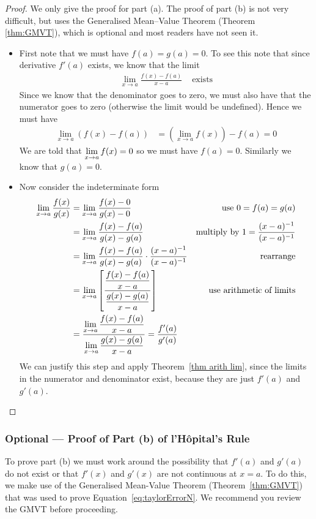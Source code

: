 \begin{proof}
We only give the proof for part (a). The proof of part (b) is not very difficult,
but uses the Generalised Mean--Value Theorem (Theorem \ref{thm:GMVT}), which is
optional and most readers have not seen it.

\begin{itemize}
 \item First note that we must have $f(a)=g(a)=0$. To see this note that since derivative
$f'(a)$ exists, we know that the limit
\begin{align*}
 \lim_{x\to a} \frac{f(x)-f(a)}{x-a} & \text{ exists}
\end{align*}
Since we know that the denominator goes to zero, we must also have that the numerator
goes to zero (otherwise the limit would be undefined). Hence we must have
\begin{align*}
  \lim_{x\to a} (f(x)-f(a)) &=
  \left( \lim_{x\to a} f(x) \right) - f(a) = 0
\end{align*}
We are told that $\displaystyle \lim_{x\to a} f(x) =0$ so we must have $f(a)=0$. Similarly we know
that $g(a)=0$.

\item Now consider the indeterminate form
\begin{align*}
  \lim_{x\to a} \frac{f(x)}{g(x)}
  &= \lim_{x\to a} \frac{f(x) - 0 }{g(x) - 0 }
  & \text{use $0=f(a)=g(a)$}\\
  &= \lim_{x\to a} \frac{f(x) - f(a) }{g(x) - g(a) }
  & \text{multiply by $1=\frac{(x-a)^{-1}}{(x-a)^{-1}}$} \\
  &= \lim_{x\to a} \frac{f(x) - f(a) }{g(x) - g(a) }\cdot\frac{(x-a)^{-1}}{(x-a)^{-1}} &
\text{rearrange} \\
  &= \lim_{x\to a} \left[ \frac{ \dfrac{f(x) - f(a)}{x-a} }{ \dfrac{g(x) - g(a)}{x-a}}
\right] & \text{use arithmetic of limits}\\
  &= \dfrac{\displaystyle \lim_{x\to a} \frac{f(x) - f(a)}{x-a} }
  {\displaystyle \lim_{x\to a} \frac{g(x) - g(a)}{x-a}} = \dfrac{f'(a)}{g'(a)}
\end{align*}
We can justify this step and apply Theorem~\ref{thm arith lim}, since the
limits in the numerator and denominator exist, because they are just $f'(a)$ and $g'(a)$.
\end{itemize}
\end{proof}
\subsubsection*{Optional --- Proof of Part (b) of l'H\^opital's Rule}
To prove part (b) we must work around the possibility that $f'(a)$ and $g'(a)$ do not
exist or that $f'(x)$ and $g'(x)$ are not continuous at $x=a$. To do this, we make use of
the  Generalised Mean-Value Theorem (Theorem~\ref{thm:GMVT}) that was used to prove
Equation~\eqref{eq:taylorErrorN}. We recommend you review the GMVT before proceeding.

